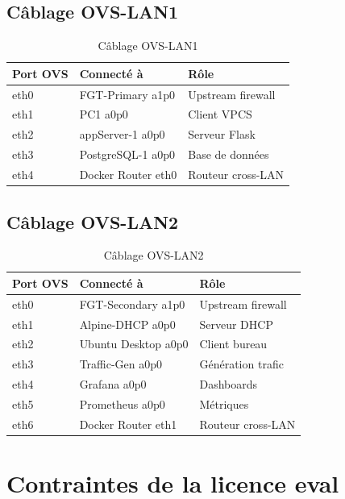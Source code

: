 \subsection{Câblage OVS-LAN1}

\begin{table}[H]
\centering
\caption{Câblage OVS-LAN1}
\label{tab:cable-ovs1}
\begin{tabularx}{\textwidth}{|l|l|X|}
\hline
\textbf{Port OVS} & \textbf{Connecté à} & \textbf{Rôle} \\
\hline
eth0 & FGT-Primary a1p0 & Upstream firewall \\
eth1 & PC1 a0p0 & Client VPCS \\
eth2 & appServer-1 a0p0 & Serveur Flask \\
eth3 & PostgreSQL-1 a0p0 & Base de données \\
eth4 & Docker Router eth0 & Routeur cross-LAN \\
\hline
\end{tabularx}
\end{table}

\subsection{Câblage OVS-LAN2}

\begin{table}[H]
\centering
\caption{Câblage OVS-LAN2}
\label{tab:cable-ovs2}
\begin{tabularx}{\textwidth}{|l|l|X|}
\hline
\textbf{Port OVS} & \textbf{Connecté à} & \textbf{Rôle} \\
\hline
eth0 & FGT-Secondary a1p0 & Upstream firewall \\
eth1 & Alpine-DHCP a0p0 & Serveur DHCP \\
eth2 & Ubuntu Desktop a0p0 & Client bureau \\
eth3 & Traffic-Gen a0p0 & Génération trafic \\
eth4 & Grafana a0p0 & Dashboards \\
eth5 & Prometheus a0p0 & Métriques \\
eth6 & Docker Router eth1 & Routeur cross-LAN \\
\hline
\end{tabularx}
\end{table}

\section{Contraintes de la licence eval}

